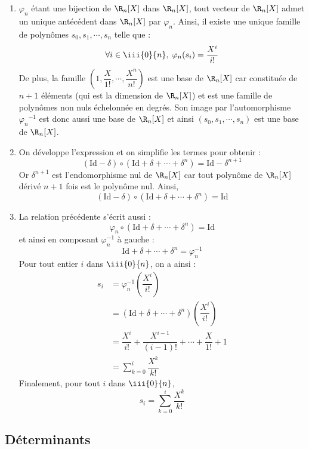 \documentclass[a4paper,twoside,french,11pt]{VcCours}
\begin{document}
\begin{enumerate}
\item
$\varphi _n$ étant une bijection de $\R_n[X]$ dans $\R_n[X]$, tout vecteur de $\R_n[X]$ admet un unique antécédent dans $\R_n[X]$ par $\varphi_n$. Ainsi, il existe une unique famille de polynômes $s_0,s_1,\cdots,s_n$ telle que : 
$$\forall i\in  \iii{0}{n}, \; \varphi _n(s_i)=\dfrac{X^i}{i!}$$
De plus, la famille $\left(1,\dfrac X{1!},\cdots, \dfrac{X^n}{n!}\right)$ est une base de $\R_n[X]$ car constituée de $n+1$ éléments (qui est la dimension de $\R_n[X]$) et est une famille de polynômes non nuls échelonnée en degrés. Son image par l'automorphisme 
${\varphi_n}^{-1}$ est donc aussi une base de $\R_n[X]$ et ainsi $(s_0,s_1,\cdots,s_n)$ est une base de $\R_n[X]$.

\item On développe l'expression et on simplifie les termes pour obtenir :
$$(\textrm{Id}-\delta )\circ(\textrm{Id}+\delta +\cdots+\delta ^n)=\textrm{Id}-\delta^{n+1}$$
Or $\delta^{n+1}$ est l'endomorphisme nul de $\R_n[X]$ car tout polynôme de $\R_n[X]$ dérivé $n+1$ fois est le polynôme nul. Ainsi, 
$$(\textrm{Id}-\delta )\circ(\textrm{Id}+\delta +\cdots+\delta ^n)=\textrm{Id}$$

\item La relation précédente s'écrit aussi :
$$ \varphi_n\circ(\textrm{Id}+\delta +\cdots+\delta ^n)=\textrm{Id}$$ 
et ainsi en composant $\varphi_n^{-1}$ à gauche :
$$ \textrm{Id}+\delta +\cdots+\delta ^n= \varphi_n^{-1}$$
Pour tout entier $i$ dans $ \iii{0}{n}$, on a ainsi :
\begin{align*}
s_i & =\varphi_n^{-1}\left(\dfrac{X^i}{i!}\right) \\
& =(\textrm{Id}+\delta +\cdots+\delta ^n)\left(\dfrac{X^i}{i!}\right) \\
& =\dfrac{X^i}{i!}+\dfrac{X^{i-1}}{(i-1)!}+\cdots+\dfrac{X}{1!}+1 \\
& =\sum_{k=0}^i\dfrac{X^k}{k!}
\end{align*}
Finalement, pour tout $i$ dans $ \iii{0}{n}$,
$$s_i=  \sum_{k=0}^i\dfrac{X^k}{k!}$$

\end{enumerate}



\subsection{Déterminants}
\end{document}
